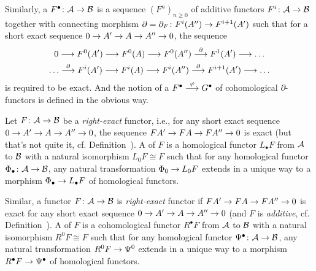 \documentclass[a4paper,parskip=half,numbers=enddot, DIV=12]{scrreprt}
\begin{document}
\begin{defi}
	Similarly, a  $F^\bullet \colon\Aa\morphism\Bb$ is a sequence $(F^n)_{n\geq 0}$ of additive functors $F^i\colon\Aa\morphism\Bb$ together with connecting morphism $\partial=\partial_F\colon F^i(A'')\morphism F^{i+1}(A')$ such that for a short exact sequence $0\morphism A'\morphism A\morphism A''\morphism 0$, the sequence 
	\begin{multline*}
		0\morphism F^0(A')\morphism F^0(A)\morphism F^0(A'')\morphism[\partial] F^1(A')\morphism\ldots\\
		\ldots\morphism[\partial]F^i(A')\morphism F^i(A)\morphism F^i(A'')\morphism[\partial]F^{i+1}(A')\morphism\ldots
	\end{multline*}
	 is required to be exact. And the notion of a  $F^\bullet \morphism[\phi]G^\bullet $ of cohomological $\partial$-functors is defined in the obvious way.
	
	Let $F\colon\Aa\morphism\Bb$ be a \emph{right-exact} functor, i.e., for any short exact sequence $0\morphism A'\morphism A\morphism A''\morphism 0$, the sequence $FA'\morphism FA\morphism FA''\morphism 0$ is exact (but that's not quite it, cf. Definition~). A  of $F$ is a homological functor $L_\bullet F$ from $\mathcal{A}$ to $\mathcal{B}$ with a natural isomorphism $L_0F\cong F$ such that for any homological functor $\Phi_\bullet \colon \Aa\morphism\Bb$, any natural transformation $\Phi_0\morphism L_0F$ extends in a unique way to a morphism $\Phi_\bullet \morphism L_\bullet F$ of homological functors.
	
	Similar, a functor $F\colon\Aa\morphism\Bb$ is \emph{right-exact} functor if $FA'\morphism FA\morphism FA''\morphism 0$ is exact for any short exact sequence $0\morphism A'\morphism A\morphism A''\morphism 0$ (and $F$ is \emph{additive}, cf. Definition~). A  of $F$ is a cohomological functor $R^\bullet F$ from $\mathcal{A}$ to $\mathcal{B}$ with a natural isomorphism $R^0F\cong F$ such that for any homological functor $\Psi^\bullet \colon \Aa\morphism\Bb$, any natural transformation $R^0F\morphism \Psi^0$ extends in a unique way to a morphism $R^\bullet F\morphism \Psi^\bullet $ of homological functors.
\end{defi}
\end{document}
